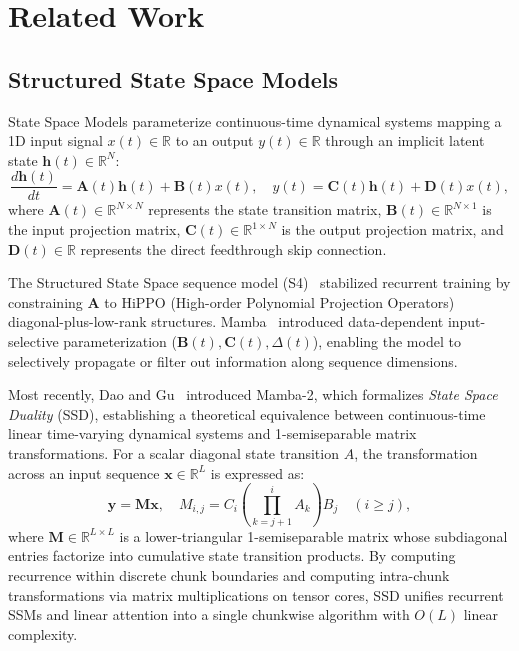 \documentclass[10pt,journal,final]{IEEEtran}
\begin{document}
\section{Related Work}
\label{sec:related_work}

\subsection{Structured State Space Models}
State Space Models parameterize continuous-time dynamical systems mapping a 1D input signal $x(t) \in \mathbb{R}$ to an output $y(t) \in \mathbb{R}$ through an implicit latent state $\mathbf{h}(t) \in \mathbb{R}^N$:
\begin{equation}
\label{eq:continuous_ssm}
\frac{d\mathbf{h}(t)}{dt} = \mathbf{A}(t)\mathbf{h}(t) + \mathbf{B}(t)x(t), \quad y(t) = \mathbf{C}(t)\mathbf{h}(t) + \mathbf{D}(t)x(t),
\end{equation}
where $\mathbf{A}(t) \in \mathbb{R}^{N \times N}$ represents the state transition matrix, $\mathbf{B}(t) \in \mathbb{R}^{N \times 1}$ is the input projection matrix, $\mathbf{C}(t) \in \mathbb{R}^{1 \times N}$ is the output projection matrix, and $\mathbf{D}(t) \in \mathbb{R}$ represents the direct feedthrough skip connection.

The Structured State Space sequence model (S4)~\cite{gu2022efficiently} stabilized recurrent training by constraining $\mathbf{A}$ to HiPPO (High-order Polynomial Projection Operators) diagonal-plus-low-rank structures. Mamba~\cite{gu2023mamba} introduced data-dependent input-selective parameterization ($\mathbf{B}(t), \mathbf{C}(t), \Delta(t)$), enabling the model to selectively propagate or filter out information along sequence dimensions. 

Most recently, Dao and Gu~\cite{dao2024transformers} introduced Mamba-2, which formalizes \textit{State Space Duality} (SSD), establishing a theoretical equivalence between continuous-time linear time-varying dynamical systems and 1-semiseparable matrix transformations. For a scalar diagonal state transition $A$, the transformation across an input sequence $\mathbf{x} \in \mathbb{R}^L$ is expressed as:
\begin{equation}
\label{eq:ssd_matrix}
\mathbf{y} = \mathbf{M}\mathbf{x}, \quad M_{i,j} = C_i \left( \prod_{k=j+1}^i A_k \right) B_j \quad (i \ge j),
\end{equation}
where $\mathbf{M} \in \mathbb{R}^{L \times L}$ is a lower-triangular 1-semiseparable matrix whose subdiagonal entries factorize into cumulative state transition products. By computing recurrence within discrete chunk boundaries and computing intra-chunk transformations via matrix multiplications on tensor cores, SSD unifies recurrent SSMs and linear attention into a single chunkwise algorithm with $O(L)$ linear complexity.
\end{document}
